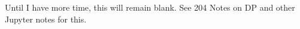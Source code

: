 Until I have more time, this will remain blank. 
See 204 Notes on DP and other Jupyter notes for this. 
